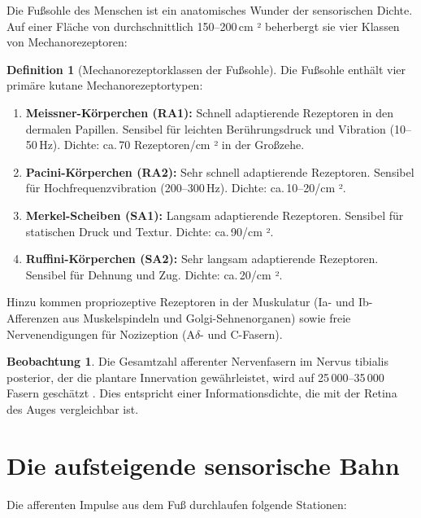 ﻿\documentclass[12pt,a4paper]{report}
\theoremstyle{plain}
\theoremstyle{definition}
\newtheorem{definition}[theorem]{Definition}
\newtheorem{beobachtung}[theorem]{Beobachtung}
\theoremstyle{remark}
\begin{document}
Die Fußsohle des Menschen ist ein anatomisches Wunder der sensorischen
Dichte. Auf einer Fläche von durchschnittlich 150--200\,cm ² beherbergt sie
vier Klassen von Mechanorezeptoren:

\begin{definition}[Mechanorezeptorklassen der Fußsohle]
Die Fußsohle enthält vier primäre kutane Mechanorezeptortypen:
\begin{enumerate}
\item \textbf{Meissner-Körperchen (RA1):} Schnell adaptierende Rezeptoren in
  den dermalen Papillen. Sensibel für leichten Berührungsdruck und
  Vibration (10--50\,Hz). Dichte: ca.\,70 Rezeptoren/cm ² in der Großzehe.
\item \textbf{Pacini-Körperchen (RA2):} Sehr schnell adaptierende Rezeptoren.
  Sensibel für Hochfrequenzvibration (200--300\,Hz). Dichte: ca.\,10--20/cm ².
\item \textbf{Merkel-Scheiben (SA1):} Langsam adaptierende Rezeptoren.
  Sensibel für statischen Druck und Textur. Dichte: ca.\,90/cm ².
\item \textbf{Ruffini-Körperchen (SA2):} Sehr langsam adaptierende Rezeptoren.
  Sensibel für Dehnung und Zug. Dichte: ca.\,20/cm ².
\end{enumerate}
\end{definition}

Hinzu kommen propriozeptive Rezeptoren in der Muskulatur (Ia- und
Ib-Afferenzen aus Muskelspindeln und Golgi-Sehnenorganen) sowie freie
Nervenendigungen für Nozizeption (A$\delta$- und C-Fasern).

\begin{beobachtung}
Die Gesamtzahl afferenter Nervenfasern im Nervus tibialis posterior, der
die plantare Innervation gewährleistet, wird auf 25\,000--35\,000 Fasern
geschätzt \cite{vallbo1979}. Dies entspricht einer Informationsdichte, die
mit der Retina des Auges vergleichbar ist.
\end{beobachtung}

\section{Die aufsteigende sensorische Bahn}

Die afferenten Impulse aus dem Fuß durchlaufen folgende Stationen:
\end{document}
